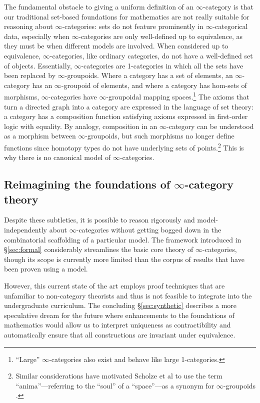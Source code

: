\documentclass[11pt]{ctexart}
\theoremstyle{definition}
\theoremstyle{remark}
\numberwithin{equation}{section}
\newcommand{\1}{\mathbbe{1}}
\newcommand{\2}{\mathbbe{2}}
\newcommand{\3}{\mathbbe{3}}
\begin{document}
The fundamental obstacle to giving a uniform definition of an $\infty$-category is that our traditional set-based foundations for mathematics are not really suitable for reasoning about $\infty$-categories: sets do not feature prominently in $\infty$-categorical data, especially when $\infty$-categories are only well-defined up to equivalence, as they must be when different models are involved. When considered up to equivalence,   $\infty$-categories, like ordinary categories,  do not have a well-defined set of objects.  Essentially, $\infty$-categories are 1-categories in which all the sets have been replaced by $\infty$-groupoids.
Where a category has a set of elements, an $\infty$-category has an $\infty$-groupoid of elements, and where a category has hom-sets of morphisms, $\infty$-categories have $\infty$-groupoidal mapping spaces.\footnote{``Large'' $\infty$-categories also exist and behave like large 1-categories.}  The axioms that turn a directed graph into a category are expressed in the language of set theory: a category has a composition function satisfying axioms expressed in first-order logic with equality. By analogy, composition in an $\infty$-category can be understood as a morphism between $\infty$-groupoids, but such morphisms no longer define functions since homotopy types do not have underlying sets of points.\footnote{Similar considerations have motivated Scholze et al to use the term ``anima''---referring to the ``soul'' of a ``space''---as a synonym for $\infty$-groupoids \cite[\S1]{CS}.}
  This is why there is no canonical model of $\infty$-categories.

\subsection*{Reimagining the foundations of \texorpdfstring{$\infty$}{infinity}-category theory}

Despite these subtleties,  it is possible to reason rigorously and model-independently about $\infty$-categories without getting bogged down in the combinatorial scaffolding of a particular model. The framework introduced in \S\ref{sec:formal} considerably streamlines the basic core theory of $\infty$-categories, though its scope is currently  more limited than the corpus of results that have been proven using a model. 

However, this current state of the art employs proof techniques that are unfamiliar to non-category theorists  and thus is not feasible to integrate into the undergraduate curriculum. The concluding \S\ref{sec:synthetic} describes a more speculative dream for the future where enhancements to the foundations of mathematics would allow us to interpret uniqueness as contractibility  and automatically ensure that all constructions are invariant under equivalence.
\end{document}
